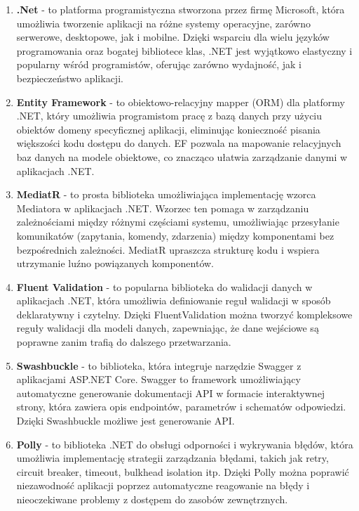 \begin{enumerate}

\item {\bf .Net} - to platforma programistyczna stworzona przez firmę Microsoft, która umożliwia tworzenie aplikacji na różne systemy operacyjne, zarówno serwerowe, desktopowe, jak i mobilne. Dzięki wsparciu dla wielu języków programowania oraz bogatej bibliotece klas, .NET jest wyjątkowo elastyczny i popularny wśród programistów, oferując zarówno wydajność, jak i bezpieczeństwo aplikacji.

\item {\bf Entity Framework} - to obiektowo-relacyjny mapper (ORM) dla platformy .NET, który umożliwia programistom pracę z bazą danych przy użyciu obiektów domeny specyficznej aplikacji, eliminując konieczność pisania większości kodu dostępu do danych. EF pozwala na mapowanie relacyjnych baz danych na modele obiektowe, co znacząco ułatwia zarządzanie danymi w aplikacjach .NET.

\item {\bf MediatR} - to prosta biblioteka umożliwiająca implementację wzorca Mediatora w aplikacjach .NET. Wzorzec ten pomaga w zarządzaniu zależnościami między różnymi częściami systemu, umożliwiając przesyłanie komunikatów (zapytania, komendy, zdarzenia) między komponentami bez bezpośrednich zależności. MediatR upraszcza strukturę kodu i wspiera utrzymanie luźno powiązanych komponentów.

\item {\bf Fluent Validation} - to popularna biblioteka do walidacji danych w aplikacjach .NET, która umożliwia definiowanie reguł walidacji w sposób deklaratywny i czytelny. Dzięki FluentValidation można tworzyć kompleksowe reguły walidacji dla modeli danych, zapewniając, że dane wejściowe są poprawne zanim trafią do dalszego przetwarzania.

\item {\bf Swashbuckle} - to biblioteka, która integruje narzędzie Swagger z aplikacjami ASP.NET Core. Swagger to framework umożliwiający automatyczne generowanie dokumentacji API w formacie interaktywnej strony, która zawiera opis endpointów, parametrów i schematów odpowiedzi. Dzięki Swashbuckle możliwe jest generowanie API.

\item {\bf Polly} -  to biblioteka .NET do obsługi odporności i wykrywania błędów, która umożliwia implementację strategii zarządzania błędami, takich jak retry, circuit breaker, timeout, bulkhead isolation itp. Dzięki Polly można poprawić niezawodność aplikacji poprzez automatyczne reagowanie na błędy i nieoczekiwane problemy z dostępem do zasobów zewnętrznych.


\end{enumerate}
